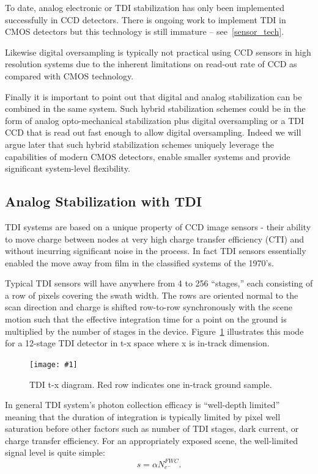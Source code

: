 \documentclass[10pt,journal]{IEEEtran}  %
\newcommand{\includefigure}[3]
{
  \begin{figure}[h!]
  \centering
  \texttt{[image: \#1]}
  \caption[]{#3}
  \label{#2}
  \end{figure}
}
\begin{document}
To date, analog electronic or TDI stabilization has only been implemented successfully in CCD detectors.  There is ongoing work to implement TDI in CMOS detectors but this technology is still immature -- see~\ref{sensor_tech}.

Likewise digital oversampling is typically not practical using CCD sensors in high resolution systems due to the inherent limitations on read-out rate of CCD as compared with CMOS technology.

Finally it is important to point out that digital and analog stabilization can be combined in the same system.  Such hybrid stabilization schemes could be in the form of analog opto-mechanical stabilization plus digital oversampling or a TDI CCD that is read out fast enough to allow digital oversampling.  Indeed we will argue later that such hybrid stabilization schemes uniquely leverage the capabilities of modern CMOS detectors, enable smaller systems and provide significant system-level flexibility.

\subsection{Analog Stabilization with TDI}

TDI systems are based on a unique property of CCD image sensors - their ability to move charge between nodes at very high charge transfer efficiency (CTI) and without incurring significant noise in the process.  In fact TDI sensors essentially enabled the move away from film in the classified systems of the 1970's.

Typical TDI sensors will have anywhere from 4 to 256 ``stages,'' each consisting of a row of pixels covering the swath width.  The rows are oriented normal to the scan direction and charge is shifted row-to-row synchronously with the scene motion such that the effective integration time for a point on the ground is multiplied by the number of stages in the device.  Figure~\ref{fig:tdi} illustrates this mode for a 12-stage TDI detector in t-x space where x is in-track dimension.

\includefigure{figures/tdi.pgf}{fig:tdi}{TDI t-x diagram.  Red row indicates one in-track ground sample.}

In general TDI system's photon collection efficacy is ``well-depth limited'' meaning that the duration of integration is typically limited by pixel well saturation before other factors such as number of TDI stages, dark current, or charge transfer efficiency.  For an appropriately exposed scene, the well-limited signal level is quite simple:
\begin{equation}
s = \alpha N_{e^-}^{FWC}
\label{eq:well_limited}.
\end{equation}
\end{document}
